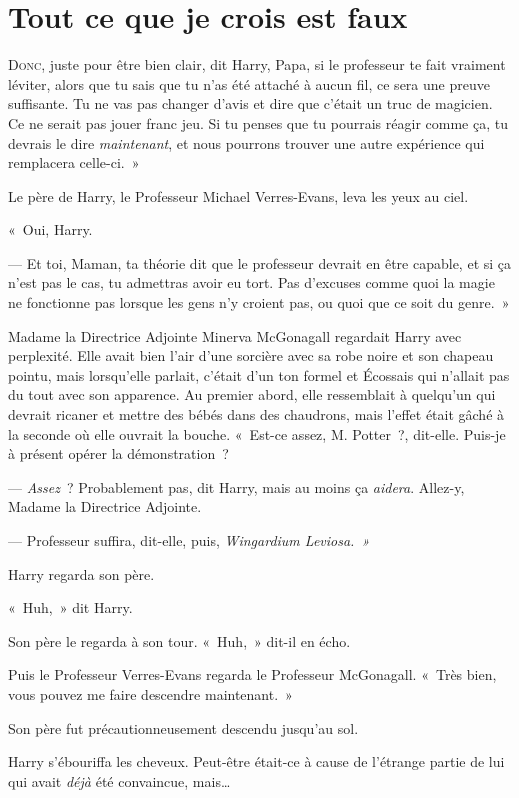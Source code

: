 \chapter{Tout ce que je crois est faux}

\lettrine[ante=«~]{D}{onc}, juste pour être bien clair, dit Harry, Papa, si le professeur te fait vraiment léviter, alors que tu sais que tu n'as été attaché à aucun fil, ce sera une preuve suffisante. Tu ne vas pas changer d'avis et dire que c'était un truc de magicien. Ce ne serait pas jouer franc jeu. Si tu penses que tu pourrais réagir comme ça, tu devrais le dire \emph{maintenant}, et nous pourrons trouver une autre expérience qui remplacera celle-ci.~»

Le père de Harry, le Professeur Michael Verres-Evans, leva les yeux au ciel.

«~Oui, Harry.

--- Et toi, Maman, ta théorie dit que le professeur devrait en être capable, et si ça n'est pas le cas, tu admettras avoir eu tort. Pas d'excuses comme quoi la magie ne fonctionne pas lorsque les gens n'y croient pas, ou quoi que ce soit du genre.~»

Madame la Directrice Adjointe Minerva McGonagall regardait Harry avec perplexité. Elle avait bien l'air d'une sorcière avec sa robe noire et son chapeau pointu, mais lorsqu'elle parlait, c'était d'un ton formel et Écossais qui n'allait pas du tout avec son apparence. Au premier abord, elle ressemblait à quelqu'un qui devrait ricaner et mettre des bébés dans des chaudrons, mais l'effet était gâché à la seconde où elle ouvrait la bouche. «~Est-ce assez, M. Potter~?, dit-elle. Puis-je à présent opérer la démonstration~?

--- \emph{Assez}~? Probablement pas, dit Harry, mais au moins ça \emph{aidera}. Allez-y, Madame la Directrice Adjointe.

--- Professeur suffira, dit-elle, puis, \emph{Wingardium Leviosa.~»}

Harry regarda son père.

«~Huh,~» dit Harry.

Son père le regarda à son tour. «~Huh,~» dit-il en écho.

Puis le Professeur Verres-Evans regarda le Professeur McGonagall. «~Très bien, vous pouvez me faire descendre maintenant.~»

Son père fut précautionneusement descendu jusqu'au sol.

Harry s'ébouriffa les cheveux. Peut-être était-ce à cause de l'étrange partie de lui qui avait \emph{déjà} été convaincue, mais…


